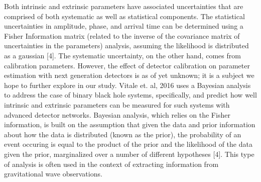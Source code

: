 \documentclass{article}
\begin{document}
Both intrinsic and extrinsic parameters have associated uncertainties that are comprised of both systematic as well as statistical components.  The statistical uncertainties in amplitude, phase, and arrival time can be determined using a Fisher Information matrix (related to the inverse of the covariance matrix of uncertainties in the parameters) analysis, assuming the likelihood is distributed as a gaussian [4].  The systematic uncertainty, on the other hand, comes from calibration parameters.  However, the effect of detector calibration on parameter estimation with next generation detectors is as of yet unknown; it is a subject we hope to further explore in our study. Vitale et. al, 2016 uses a Bayesian analysis to address the case of binary black hole systems, specifically, and predict how well intrinsic and extrinsic parameters can be measured for such systems with advanced detector networks.  Bayesian analysis, which relies on the Fisher information, is built on the assumption that given the data and prior information about how the data is distributed (known as the prior), the probability of an event occuring is equal to the product of the prior and the likelihood of the data given the prior, marginalized over a number of different hypotheses [4].  This type of analysis is often used in the context of extracting information from gravitational wave observations. 
\end{document}
